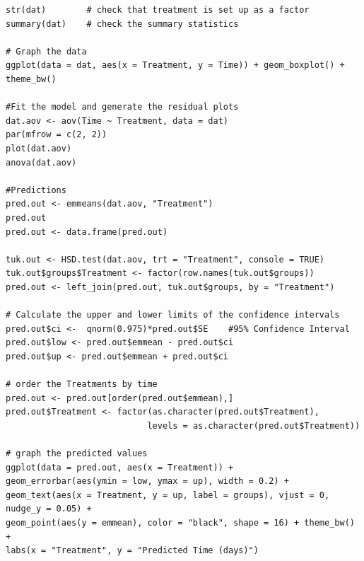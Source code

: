 \documentclass[a4paper, 10pt, fleqn, twosided]{memoir}
\begin{document}
\begin{tcolorbox}[title = Exercise 2 code]
\begin{verbatim}
str(dat)        # check that treatment is set up as a factor
summary(dat)    # check the summary statistics

# Graph the data
ggplot(data = dat, aes(x = Treatment, y = Time)) + geom_boxplot() +
theme_bw()

#Fit the model and generate the residual plots
dat.aov <- aov(Time ~ Treatment, data = dat)
par(mfrow = c(2, 2))
plot(dat.aov)
anova(dat.aov)

#Predictions
pred.out <- emmeans(dat.aov, "Treatment")
pred.out
pred.out <- data.frame(pred.out)

tuk.out <- HSD.test(dat.aov, trt = "Treatment", console = TRUE)
tuk.out$groups$Treatment <- factor(row.names(tuk.out$groups))
pred.out <- left_join(pred.out, tuk.out$groups, by = "Treatment")

# Calculate the upper and lower limits of the confidence intervals
pred.out$ci <-  qnorm(0.975)*pred.out$SE    #95% Confidence Interval
pred.out$low <- pred.out$emmean - pred.out$ci
pred.out$up <- pred.out$emmean + pred.out$ci

# order the Treatments by time
pred.out <- pred.out[order(pred.out$emmean),]
pred.out$Treatment <- factor(as.character(pred.out$Treatment),
                            levels = as.character(pred.out$Treatment))
 
# graph the predicted values 
ggplot(data = pred.out, aes(x = Treatment)) +
geom_errorbar(aes(ymin = low, ymax = up), width = 0.2) +
geom_text(aes(x = Treatment, y = up, label = groups), vjust = 0, nudge_y = 0.05) +
geom_point(aes(y = emmean), color = "black", shape = 16) + theme_bw() +
labs(x = "Treatment", y = "Predicted Time (days)")
\end{verbatim}
\end{tcolorbox}
\end{document}
